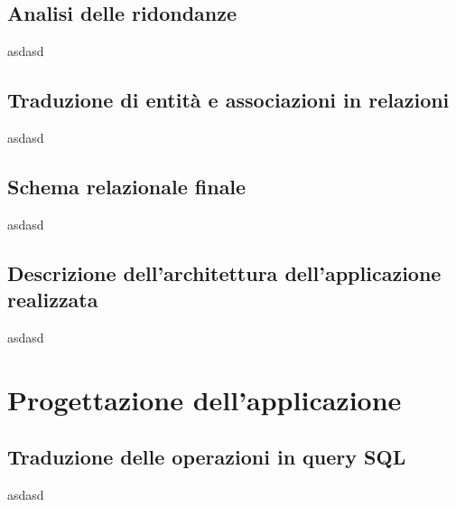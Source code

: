\documentclass[a4paper,12pt]{report}
\begin{document}
            






    	\section{Analisi delle ridondanze}
        	asdasd
        	
    	\section{Traduzione di entità e associazioni in relazioni}
        	asdasd
        	
    	\section{Schema relazionale finale}
        	asdasd
        	
    	\section{Descrizione dell'architettura dell'applicazione realizzata}
        	asdasd
        	

	\chapter*{Progettazione dell'applicazione}
	
    	\section*{Traduzione delle operazioni in query SQL}
    	    asdasd
 
\end{document}
